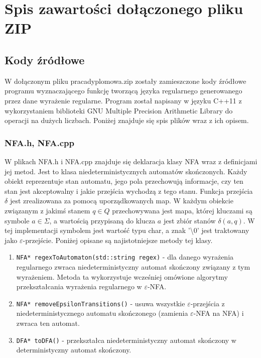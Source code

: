 \chapter{Spis zawartości dołączonego pliku ZIP}\label{app:codes}

\section{Kody źródłowe}

W dołączonym pliku praca\textunderscore dyplomowa.zip zostały zamieszczone kody źródłowe programu wyznaczającego funkcję tworzącą języka regularnego generowanego przez dane wyrażenie regularne. Program został napisany w języku C++11 z wykorzystaniem biblioteki GNU Multiple Precision Arithmetic Library do operacji na dużych liczbach. Poniżej znajduje się spis plików wraz z ich opisem.

\subsection{NFA.h, NFA.cpp}

W plikach NFA.h i NFA.cpp znajduje się deklaracja klasy NFA wraz z definicjami jej metod. Jest to klasa niedeterministycznych automatów skończonych. Każdy obiekt reprezentuje stan automatu, jego pola przechowują informacje, czy ten stan jest akceptowalny i jakie przejścia wychodzą z tego stanu. Funkcja przejścia $\delta$ jest zrealizowana za pomocą uporządkowanych map. W każdym obiekcie związanym z jakimś stanem $q\in Q$ przechowywana jest mapa, której kluczami są symbole $a\in\Sigma$, a wartością przypisaną do klucza $a$ jest zbiór stanów $\delta(a,q)$. W tej implementacji symbolem jest wartość typu char, a znak '\textbackslash0' jest traktowany jako $\varepsilon$-przejście. Poniżej opisane są najistotniejsze metody tej klasy.
\begin{enumerate}
    \item \texttt{NFA* regexToAutomaton(std::string regex)} - dla danego wyrażenia regularnego zwraca niedeterministyczny automat skończony związany z tym wyrażeniem. Metoda ta wykorzystuje wcześniej omówione algorytmy przekształcania wyrażenia regularnego w $\varepsilon$-NFA.
    \item \texttt{NFA* removeEpsilonTransitions()} - usuwa wszystkie $\varepsilon$-przejścia z niedeterministycznego automatu skończonego (zamienia $\varepsilon$-NFA na NFA) i zwraca ten automat.
    \item \texttt{DFA* toDFA()} - przekształca niedeterministyczny automat skończony w deterministyczny automat skończony.
\end{enumerate}

